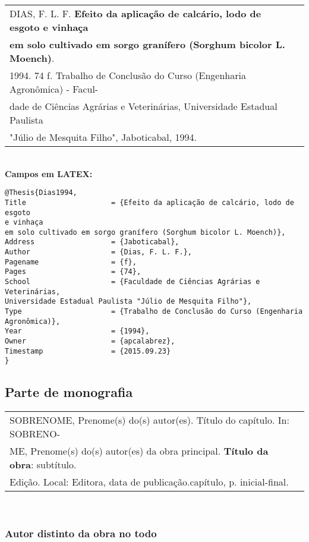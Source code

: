 \begin{tabular}{|l|c|} \hline
DIAS, F. L. F. \textbf{Efeito da aplicação de calcário, lodo de esgoto e vinhaça} \\ \textbf{em solo cultivado em sorgo granífero (Sorghum bicolor L. Moench)}. \\1994. 74 f. Trabalho de Conclusão do Curso (Engenharia Agronômica) - Facul-\\dade de Ciências Agrárias e Veterinárias, Universidade Estadual Paulista \\"Júlio de Mesquita Filho", Jaboticabal, 1994.     \\\hline
\end{tabular} \\
	
	\textbf{Campos em LATEX:} 
	
	\begin{verbatim}
@Thesis{Dias1994,
Title                    = {Efeito da aplicação de calcário, lodo de esgoto 
e vinhaça 
em solo cultivado em sorgo granífero (Sorghum bicolor L. Moench)},
Address                  = {Jaboticabal},
Author                   = {Dias, F. L. F.},
Pagename                 = {f},
Pages                    = {74},
School                   = {Faculdade de Ciências Agrárias e Veterinárias, 
Universidade Estadual Paulista "Júlio de Mesquita Filho"},
Type                     = {Trabalho de Conclusão do Curso (Engenharia 
Agronômica)},
Year                     = {1994},
Owner                    = {apcalabrez},
Timestamp                = {2015.09.23}
}
	\end{verbatim}
\subsection{Parte de monografia}	

\begin{tabular}{|l|c|} \hline
SOBRENOME, Prenome(s) do(s) autor(es). Título do capítulo. In: SOBRENO-\\ME, Prenome(s) do(s) autor(es) da obra principal. \textbf{Título da obra}: subtítulo. \\Edição. Local: Editora, data de publicação.capítulo, p. inicial-final.     \\\hline
\end{tabular} \\

\subsubsection{Autor distinto da obra no todo} 

